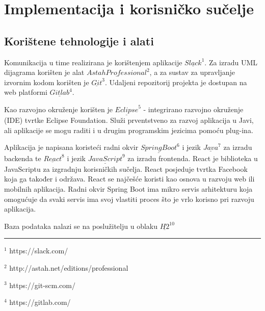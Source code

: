 \chapter{Implementacija i korisničko sučelje}
		
		
		\section{Korištene tehnologije i alati}
		
%			
			
			Komunikacija u time realizirana je korištenjem aplikacije ${\underline{Slack}}^{1}$. Za izradu UML dijagrama korišten je alat ${\underline{Astah Professional}}^{2}$, a za sustav za upravljanje izvornim kodom korišten je ${\underline{Git}}^{3}$. Udaljeni repozitorij projekta je dostupan na web platformi ${\underline{Gitlab}}^{4}$.
			
			Kao razvojno okruženje korišten je ${\underline{Eclipse}}^{5}$ - integrirano razvojno okruženje (IDE) tvrtke Eclipse Foundation. Služi prventstveno za razvoj aplikacija u Javi, ali aplikacije se mogu raditi i u drugim programskim jezicima pomoću plug-ina.
			
			Aplikacija je napisana koristeći radni okvir ${\underline{Spring Boot}}^{6}$ i jezik ${\underline{Java}}^{7}$ za izradu backenda te ${\underline{React}}^{8}$ i jezik ${\underline{JavaScript}}^{9}$ za izradu frontenda. React je biblioteka u JavaScriptu za izgradnju korisničkih sučelja. React posjeduje tvrtka Facebook koja ga također i održava. React se najčešće koristi kao osnova u razvoju web ili mobilnih aplikacija. Radni okvir Spring Boot ima mikro servis arhitekturu koja omogućuje da svaki servis ima svoj vlastiti proces što je vrlo korisno pri razvoju aplikacija.
			
			Baza podataka nalazi se na poslužitelju u oblaku ${\underline{H2}}^{10}$
			\hrule
			\smallskip
			${}^{1}$ https://slack.com/
			
			${}^{2}$ http://astah.net/editions/professional
			
			${}^{3}$ https://git-scm.com/
			
			${}^{4}$ https://gitlab.com/
			
